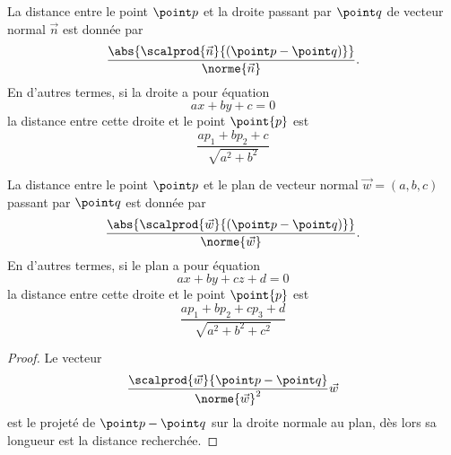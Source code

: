 \begin{frame}
  \begin{proposition}
  La distance entre le point \(\point p\) et la droite passant par \(\point q\) de vecteur normal \(\vec n\) est donnée par
  \begin{equation*}
    \frac{\abs{\scalprod {\vec n} {(\point p - \point q)}}}{\norme {\vec n}}.
  \end{equation*}\pause
  En d'autres termes, si la droite a pour équation
  \begin{equation*}
    a x + b y + c = 0
  \end{equation*}
  la distance entre cette droite et le point \(\point{p}\) est
  \begin{equation*}
    \frac{a p_{1} + b p_{2} + c}{\sqrt{a^{2} + b^{2}}}
  \end{equation*}
\end{proposition}

\end{frame}
\begin{frame}
\begin{proposition}
  La distance entre le point \(\point p\) et le plan de vecteur normal \(\vec w = (a,b,c)\) passant par \(\point q\) est donnée par
  \begin{equation*}
    \frac{\abs{\scalprod {\vec w} {(\point p - \point q)}}}{\norme {\vec w}}.
  \end{equation*}\pause
  En d'autres termes, si le plan a pour équation
  \begin{equation*}
    a x + b y + c z + d = 0
  \end{equation*}
  la distance entre cette droite et le point \(\point{p}\) est
  \begin{equation*}
    \frac{a p_{1} + b p_{2} + c p_{3} + d}{\sqrt{a^{2} + b^{2} + c^{2}}}
  \end{equation*}
\end{proposition}
\begin{proof}
  Le vecteur
  \begin{equation*}
    \frac{\scalprod {\vec w} {\point p - \point q}}{\norme {\vec w}^{2}}\vec w
  \end{equation*}
  est le projeté de \(\point p - \point q\) sur la droite normale au plan, dès lors sa longueur est la distance recherchée.
\end{proof}
\end{frame}
